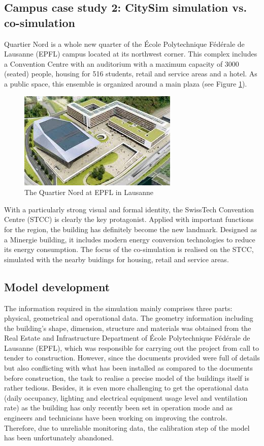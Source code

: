 \documentclass{tBPS2e}
\theoremstyle{plain}
\theoremstyle{definition}
\theoremstyle{remark}
\begin{document}
\subsection{Campus case study 2: CitySim simulation vs. co-simulation}
Quartier Nord is a whole new quarter of the École Polytechnique Fédérale de Lausanne (EPFL) campus located at its northwest corner. This complex includes a Convention Centre with an auditorium with a maximum capacity of 3000 (seated) people, housing for 516 students, retail and service areas and a hotel. As a public space, this ensemble is organized around a main plaza (see Figure \ref{fig:quartier_nord_1}).

\begin{figure}[H]
\centering
\includegraphics[]{figures/quartier_nord_1}
\caption{The Quartier Nord at EPFL in Lausanne}
\label{fig:quartier_nord_1}
\end{figure}

With a particularly strong visual and formal identity, the SwissTech Convention Centre (STCC) is clearly the key protagonist. Applied with important functions for the region, the building has definitely become the new landmark. Designed as a Minergie building, it includes modern energy conversion technologies to reduce its energy consumption. The focus of the co-simulation is realised on the STCC, simulated with the nearby buidings for housing, retail and service areas.

\subsection{Model development}
The information required in the simulation mainly comprises three parts: physical, geometrical and operational data. The geometry information including the building’s shape, dimension, structure and materials was obtained from the Real Estate and Infrastructure Department of École Polytechnique Fédérale de Lausanne (EPFL), which was responsible for carrying out the project from call to tender to construction. However, since the documents provided were full of details but also conflicting with what has been installed as compared to the documents before construction, the task to realise a precise model of the buildings itself is rather tedious. Besides, it is even more challenging to get the operational data (daily occupancy, lighting and electrical equipment usage level and ventilation rate) as the building has only recently been set in operation mode and as engineers and technicians have been working on improving the controls. Therefore, due to unreliable monitoring data, the calibration step of the model has been unfortunately abandoned.\\
\end{document}
